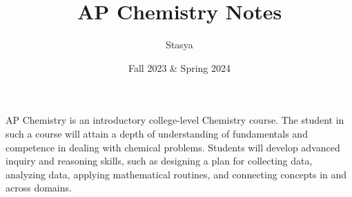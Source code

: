 \documentclass[10pt,a4paper,oneside]{book}
\title{AP Chemistry Notes}
\author{Stasya}
\date{Fall 2023 \& Spring 2024}
\begin{document}
\maketitle
\bigbreak
\begin{center}
    AP Chemistry is an introductory college-level Chemistry course. The student in such a course will attain a depth of 
understanding of fundamentals and competence in dealing with chemical problems. Students will develop advanced inquiry 
and reasoning skills, such as designing a plan for collecting data, analyzing data, applying mathematical routines, and 
connecting concepts in and across domains.
\end{center}

\bigbreak
\tableofcontents









\end{document}

